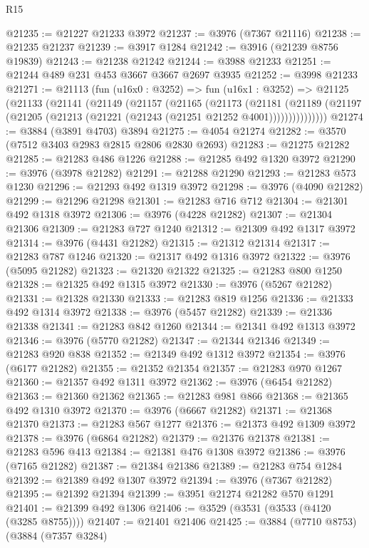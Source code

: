 \begin{lexlean}{R15}
\begin{coremodule}
@21235 := @21227 @21233 @3972
@21237 := @3976 (@7367 @21116)
@21238 := @21235 @21237
@21239 := @3917 @1284
@21242 := @3916 (@21239 @8756 @19839)
@21243 := @21238 @21242
@21244 := @3988 @21233
@21251 := @21244 @489 @231 @453 @3667 @3667 @2697 @3935
@21252 := @3998 @21233
@21271 := @21113
    (fun (u16x0 : @3252) =>
    fun (u16x1 : @3252) =>
    @21125
      (@21133
        (@21141
          (@21149
            (@21157
              (@21165
                (@21173
                  (@21181
                    (@21189
                      (@21197 (@21205 (@21213 (@21221 (@21243 (@21251 @21252 @4001)))))))))))))))
@21274 := @3884 (@3891 @4703) @3894
@21275 := @4054 @21274
@21282 := @3570 (@7512 @3403 @2983 @2815 @2806 @2830 @2693)
@21283 := @21275 @21282
@21285 := @21283 @486 @1226
@21288 := @21285 @492 @1320 @3972
@21290 := @3976 (@3978 @21282)
@21291 := @21288 @21290
@21293 := @21283 @573 @1230
@21296 := @21293 @492 @1319 @3972
@21298 := @3976 (@4090 @21282)
@21299 := @21296 @21298
@21301 := @21283 @716 @712
@21304 := @21301 @492 @1318 @3972
@21306 := @3976 (@4228 @21282)
@21307 := @21304 @21306
@21309 := @21283 @727 @1240
@21312 := @21309 @492 @1317 @3972
@21314 := @3976 (@4431 @21282)
@21315 := @21312 @21314
@21317 := @21283 @787 @1246
@21320 := @21317 @492 @1316 @3972
@21322 := @3976 (@5095 @21282)
@21323 := @21320 @21322
@21325 := @21283 @800 @1250
@21328 := @21325 @492 @1315 @3972
@21330 := @3976 (@5267 @21282)
@21331 := @21328 @21330
@21333 := @21283 @819 @1256
@21336 := @21333 @492 @1314 @3972
@21338 := @3976 (@5457 @21282)
@21339 := @21336 @21338
@21341 := @21283 @842 @1260
@21344 := @21341 @492 @1313 @3972
@21346 := @3976 (@5770 @21282)
@21347 := @21344 @21346
@21349 := @21283 @920 @838
@21352 := @21349 @492 @1312 @3972
@21354 := @3976 (@6177 @21282)
@21355 := @21352 @21354
@21357 := @21283 @970 @1267
@21360 := @21357 @492 @1311 @3972
@21362 := @3976 (@6454 @21282)
@21363 := @21360 @21362
@21365 := @21283 @981 @866
@21368 := @21365 @492 @1310 @3972
@21370 := @3976 (@6667 @21282)
@21371 := @21368 @21370
@21373 := @21283 @567 @1277
@21376 := @21373 @492 @1309 @3972
@21378 := @3976 (@6864 @21282)
@21379 := @21376 @21378
@21381 := @21283 @596 @413
@21384 := @21381 @476 @1308 @3972
@21386 := @3976 (@7165 @21282)
@21387 := @21384 @21386
@21389 := @21283 @754 @1284
@21392 := @21389 @492 @1307 @3972
@21394 := @3976 (@7367 @21282)
@21395 := @21392 @21394
@21399 := @3951 @21274 @21282 @570 @1291
@21401 := @21399 @492 @1306
@21406 := @3529 (@3531 (@3533 (@4120 (@3285 @8755))))
@21407 := @21401 @21406
@21425 := @3884
    (@7710 @8753)
    (@3884
      (@7357 @3284)

\end{coremodule}
\end{lexlean}
